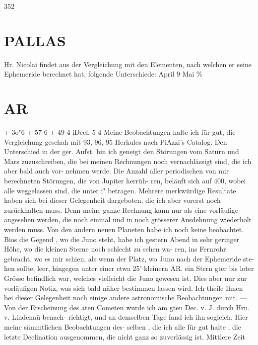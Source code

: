 \documentclass[12pt,a4paper]{article}
\begin{document}
\newpage
352 

\section*{PALLAS}
Hr.  Nicolai  findet  aus  der  Vergleichung  mit  den  Elementen,  nach  welchen  er  seine  Ephemeride 
berechnet  hat,  folgende  Unterschiede: 
April  9 
Mai      \% 

\section*{AR}
+  3o"6 
+  57-6 
+  49-4 
iDecl. 
5  4 
Meine  Beobachtungen  halte  ich  für  gut,  die  Vergleichung  geschah  mit  93,  96,  95  Herkules  nach 
PiAzzi's  Catalog.  Den  Unterschied  in  der  ger.  Aufst.  bin  ich  geneigt  den  Störungen  vom  Saturn  und 
Mars  zuzuschreiben,  die  bei  meinen  Rechnungen  noch  vernachlässigt  sind,  die  ich  aber  bald  auch  vor- 
nehmen werde.  Die  Anzahl  aller  periodischen  von  mir  berechneten  Störungen,  die  von  Jupiter  herrüh- 
ren, beläuft  sich  auf  400,  wobei  alle  weggelassen  sind,  die  unter  i"  betragen.  Mehrere  merkwürdige 
Resultate  haben  sich  bei  dieser  Gelegenheit  dargeboten,  die  ich  aber  vorerst  noch  zurückhalten  muss. 
Denn  meine  ganze  Rechnung  kann  nur  als  eine  vorläufige  angesehen  werden,  die  noch  einmal  und  in 
noch  grösserer  Ausdehnung  wiederholt  werden  muss. 
Von  den  andern  neuen  Planeten  habe  ich  noch  keine  beobachtet.  Bios  die  Gegend ,  wo  die  Juno 
steht,  habe  ich  gestern  Abend  in  sehr  geringer  Höhe,  wo  die  kleinen  Sterne  noch  schlecht  zu  sehen  wa- 
ren, ins  Fernrohr  gebracht,  wo  es  mir  schien,  als  wenn  der  Platz,  wo  Juno  nach  der  Ephemeride  ste- 
hen sollte,  leer,  hingegen  unter  einer  etwa  25'  kleinern  AR.  ein  Stern  gter  bis  loter  Grösse  befindlich 
war,  welches  vielleicht  die  Juno  gewesen  ist.  Dies  aber  nur  zur  vorläufigen  Notiz,  was  sich  bald  näher 
bestimmen  lassen  wird. 
Ich  theile  Ihnen  bei  dieser  Gelegenheit  noch  einige  andere  astronomische  Beobachtungen  mit. --- 
Von  der  Erscheinung  des  aten  Cometen  wurde  ich  am  gten  Dec.  v.  J.  durch  Hrn.  v.  Lindenaü  benach- 
richtigt, und  an  demselben  Tage  fand  ich  ihn  sogleich.  Hier  meine  sämmtlichen  Beobachtungen  des- 
selben ,  die  ich  alle  für  gut  halte ,  die  letzte  Declination  ausgenommen,  die  nicht  ganz  so  zuverlässig  ist. 
Mittlere  Zeit 
\end{document}
